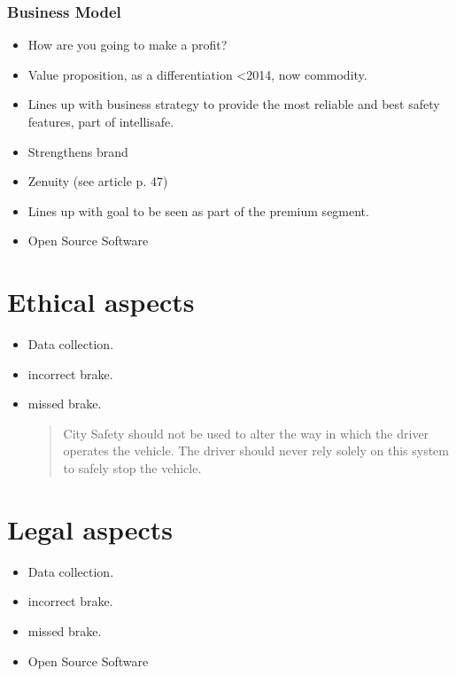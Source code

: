 \documentclass[conference]{IEEEtran}
\begin{document}
\subsubsection{Business Model}
\begin{itemize}
	\item How are you going to make a profit?
\end{itemize}
\begin{itemize}
	\item Value proposition, as a differentiation <2014, now commodity.
	\item Lines up with business strategy to provide the most reliable and best safety features, part of intellisafe.
	\item Strengthens brand
	\item Zenuity (see article p. 47)
	\item Lines up with goal to be seen as part of the premium segment.
	\item Open Source Software
\end{itemize}


\section{Ethical aspects}
\begin{itemize}
	\item Data collection.
	\item incorrect brake.
	\item missed brake.
	\begin{quotation}
		City Safety should not be used to alter the way in which the driver operates the vehicle. The driver should never rely solely on this system to safely stop the vehicle.
	\end{quotation}
\end{itemize}


\section{Legal aspects}
\begin{itemize}
	\item Data collection.
	\item incorrect brake.
	\item missed brake.
	\item Open Source Software
\end{itemize}
\end{document}
